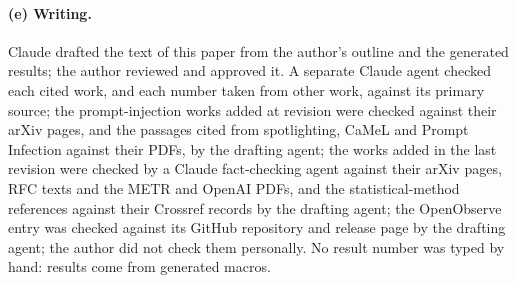 \paragraph{(e) Writing.}
Claude drafted the text of this paper from the author's outline and the generated results; the author reviewed and approved it.
A separate Claude agent checked each cited work, and each number taken from other work, against its primary source; the prompt-injection works added at revision were checked against their arXiv pages, and the passages cited from spotlighting, CaMeL and Prompt Infection against their PDFs, by the drafting agent; the works added in the last revision were checked by a Claude fact-checking agent against their arXiv pages, RFC texts and the METR and OpenAI PDFs, and the statistical-method references against their Crossref records by the drafting agent; the OpenObserve entry was checked against its GitHub repository and release page by the drafting agent; the author did not check them personally.
No result number was typed by hand: results come from generated macros.
